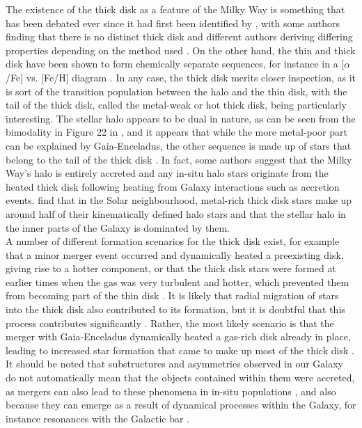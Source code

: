 \documentclass[a4paper,11pt]{article}
\begin{document}
The existence of the thick disk as a feature of the Milky Way is something that has been debated ever since it had first been identified by \citet{gilmore83}, with some authors finding that there is no distinct thick disk \citep{bovy12} and different authors deriving differing properties depending on the method used \citep{kawata16}. On the other hand, the thin and thick disk have been shown to form chemically separate sequences, for instance in a [$\alpha$/Fe] vs. [Fe/H] diagram \citep[e.g.,][]{hayden15}. In any case, the thick disk merits closer inspection, as it is sort of the transition population between the halo and the thin disk, with the tail of the thick disk, called the metal-weak or hot thick disk, being particularly interesting. The stellar halo appears to be dual in nature, as can be seen from the bimodality in Figure 22 in \citet{gaiaobshrd}, and it appears that while the more metal-poor part can be explained by Gaia-Enceladus, the other sequence is made up of stars that belong to the tail of the thick disk \citep{helmi20}. In fact, some authors suggest that the Milky Way's halo is entirely accreted and any in-situ halo stars originate from the heated thick disk following heating from Galaxy interactions such as accretion events. \citet{dimatteo19} find that in the Solar neighbourhood, metal-rich thick disk stars make up around half of their kinematically defined halo stars and that the stellar halo in the inner parts of the Galaxy is dominated by them.\\
%
A number of different formation scenarios for the thick disk exist, for example that a minor merger event occurred and dynamically heated a preexisting disk, giving rise to a hotter component, or that the thick disk stars were formed at earlier times when the gas was very turbulent and hotter, which prevented them from becoming part of the thin disk \citep{robin14}. It is likely that radial migration of stars into the thick disk also contributed to its formation, but it is doubtful that this process contributes significantly \citep{minchev12}. Rather, the most likely scenario is that the merger with Gaia-Enceladus dynamically heated a gas-rich disk already in place, leading to increased star formation that came to make up most of the thick disk \citep{gallart19,helmi20}. It should be noted that substructures and asymmetries observed in our Galaxy do not automatically mean that the objects contained within them were accreted, as mergers can also lead to these phenomena in in-situ populations \citep[e.g.,][]{gomez12}, and also because they can emerge as a result of dynamical processes within the Galaxy, for instance resonances with the Galactic bar \citep{helmi20}.\\ \\
\end{document}
